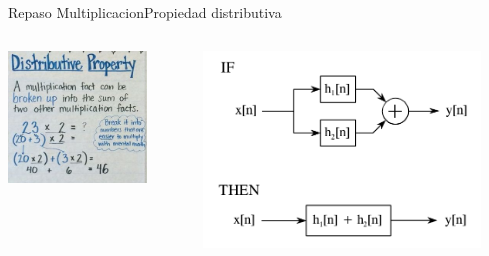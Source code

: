 \begin{frame}{Repaso Multiplicacion}{Propiedad distributiva}
   \begin{columns}[c]
      \hspace{5pt}
      \begin{column}{0.5\textwidth}
         \centering\includegraphics[width=0.8\textwidth]{5_clase/multi_distributiva}
      \end{column}
      \hspace{2pt}
      \vrule
      \hspace{2pt}
      \begin{column}{0.5\textwidth}
         \centering\includegraphics[width=0.9\textwidth]{5_clase/conv_distributiva}
      \end{column}
      \hspace{2pt}
   \end{columns}
   \vfill
\end{frame}
